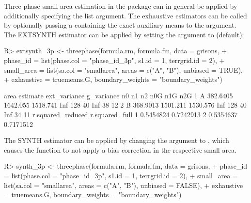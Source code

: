 Three-phase small area estimation in the package can in general be applied by additionally specifying the  list argument. The exhaustive estimators can be called by optionally passing a  containing the exact auxiliary means to the  argument. The EXTSYNTH estimator can be applied by setting the argument  to  (default):

\begin{small}
\begin{Schunk}
\begin{Sinput}
R> extsynth_3p <- threephase(formula.rm, formula.fm, data = grisons,
+    phase_id = list(phase.col = "phase_id_3p", s1.id = 1, terrgrid.id = 2),
+    small_area = list(sa.col = "smallarea", areas = c("A", "B"), unbiased = TRUE),
+    exhaustive = truemeans.G, boundary_weights = "boundary_weights")
\end{Sinput}
\end{Schunk}
\end{small}


\begin{small}
\begin{Schunk}
\begin{Soutput}
  area estimate ext_variance g_variance  n0  n1 n2 n0G n1G n2G
1    A 382.6405     1642.055   1518.741 Inf 128 40 Inf  38  12
2    B 368.9013     1501.211   1530.576 Inf 128 40 Inf  34  11
  r.squared_reduced r.squared_full
1         0.5454824      0.7242913
2         0.5354637      0.7171512
\end{Soutput}
\end{Schunk}
\end{small}

The SYNTH estimator can be applied by changing the argument  to , which causes the function to not apply a bias correction in the respective small area.

\begin{small}
\begin{Schunk}
\begin{Sinput}
R> synth_3p <- threephase(formula.rm, formula.fm, data = grisons,
+    phase_id = list(phase.col = "phase_id_3p", s1.id = 1, terrgrid.id = 2),
+    small_area = list(sa.col = "smallarea", areas = c("A", "B"), unbiased = FALSE),
+    exhaustive = truemeans.G, boundary_weights = "boundary_weights")
\end{Sinput}
\end{Schunk}
\end{small}

